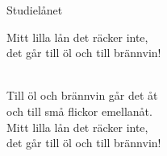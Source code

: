 \begin{song}{Studielånet}
    
	
	
	\begin{repetition}
		Mitt lilla lån det räcker inte,\\
		det går till öl och till brännvin!
	\end{repetition}\\
	Till öl och brännvin går det åt\\
	och till små flickor emellanåt.\\
	Mitt lilla lån det räcker inte,\\
	det går till öl och till brännvin!
	
\end{song}
